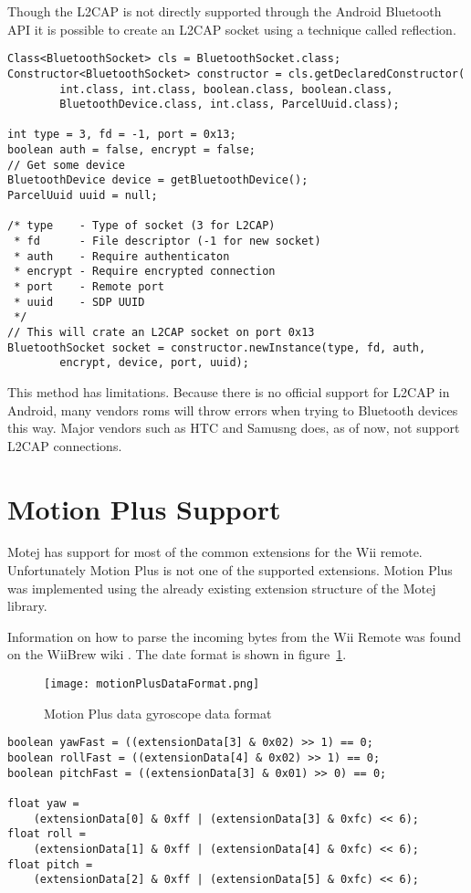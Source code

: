 Though the L2CAP is not directly supported through the Android Bluetooth API it is possible to create an L2CAP socket using a technique called reflection.

\begin{lstlisting}
Class<BluetoothSocket> cls = BluetoothSocket.class;
Constructor<BluetoothSocket> constructor = cls.getDeclaredConstructor(
		int.class, int.class, boolean.class, boolean.class,
		BluetoothDevice.class, int.class, ParcelUuid.class);

int type = 3, fd = -1, port = 0x13;
boolean auth = false, encrypt = false;
// Get some device
BluetoothDevice device = getBluetoothDevice();
ParcelUuid uuid = null;

/* type    - Type of socket (3 for L2CAP)
 * fd      - File descriptor (-1 for new socket)
 * auth    - Require authenticaton
 * encrypt - Require encrypted connection
 * port    - Remote port
 * uuid	   - SDP UUID
 */
// This will crate an L2CAP socket on port 0x13
BluetoothSocket socket = constructor.newInstance(type, fd, auth,
		encrypt, device, port, uuid);
\end{lstlisting}

This method has limitations. Because there is no official support for L2CAP in Android, many vendors roms will throw errors when trying to Bluetooth devices this way. Major vendors such as HTC and Samusng does, as of now, not support L2CAP connections.

\section{Motion Plus Support}
Motej has support for most of the common extensions for the Wii remote. Unfortunately Motion Plus is not one of the supported extensions. Motion Plus was implemented using the already existing extension structure of the Motej library.

Information on how to parse the incoming bytes from the Wii Remote was found on the WiiBrew wiki \cite{wiiBrew}. The date format is shown in figure~\ref{fig:motionPlusDataFormat}.

\begin{figure}[h!]
  \centering
    \texttt{[image: motionPlusDataFormat.png]}
    \caption{\footnotesize Motion Plus data gyroscope data format}
    \label{fig:motionPlusDataFormat}
\end{figure}

\begin{lstlisting}
boolean yawFast = ((extensionData[3] & 0x02) >> 1) == 0;
boolean rollFast = ((extensionData[4] & 0x02) >> 1) == 0;
boolean pitchFast = ((extensionData[3] & 0x01) >> 0) == 0;

float yaw = 
	(extensionData[0] & 0xff | (extensionData[3] & 0xfc) << 6);
float roll = 
	(extensionData[1] & 0xff | (extensionData[4] & 0xfc) << 6);
float pitch = 
	(extensionData[2] & 0xff | (extensionData[5] & 0xfc) << 6);
\end{lstlisting}

